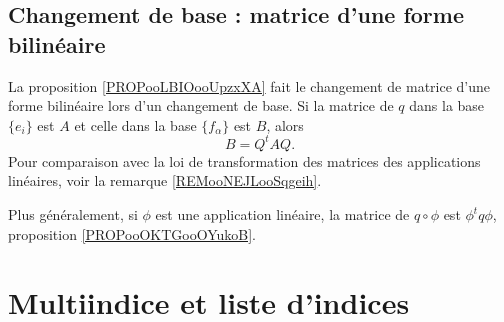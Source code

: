 \subsection{Changement de base : matrice d'une forme bilinéaire}

La proposition \ref{PROPooLBIOooUpzxXA} fait le changement de matrice d'une forme bilinéaire lors d'un changement de base. Si la matrice de \( q\) dans la base \( \{ e_i \}\) est \( A\) et celle dans la base \( \{ f_{\alpha} \}\) est \( B\), alors
\begin{equation}
	B=Q^tAQ.
\end{equation}
Pour comparaison avec la loi de transformation des matrices des applications linéaires, voir la remarque \ref{REMooNEJLooSqgeih}.

Plus généralement, si \( \phi\) est une application linéaire, la matrice de \( q\circ \phi\) est \( \phi^tq\phi\), proposition \ref{PROPooOKTGooOYukoB}.

\section{Multiindice et liste d'indices}

